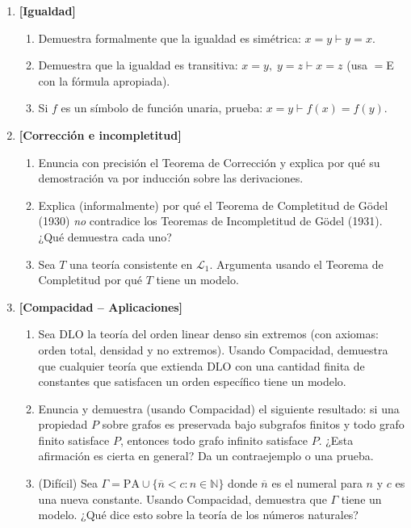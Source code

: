\begin{enumerate}[leftmargin=2em, label=\textbf{Problema \arabic*.}, itemsep=1em]
  \item \textbf{[Igualdad]}
  \begin{enumerate}[label=(\alph*)]
    \item Demuestra formalmente que la igualdad es simétrica: $x = y \vdash y = x$.
    \item Demuestra que la igualdad es transitiva: $x = y,\; y = z \vdash x = z$ (usa ${=}$E con la fórmula apropiada).
    \item Si $f$ es un símbolo de función unaria, prueba: $x = y \vdash f(x) = f(y)$.
  \end{enumerate}

  \item \textbf{[Corrección e incompletitud]}
  \begin{enumerate}[label=(\alph*)]
    \item Enuncia con precisión el Teorema de Corrección y explica por qué su demostración va por inducción sobre las derivaciones.
    \item Explica (informalmente) por qué el Teorema de Completitud de Gödel (1930) \emph{no} contradice los Teoremas de Incompletitud de Gödel (1931). ¿Qué demuestra cada uno?
    \item Sea $T$ una teoría consistente en $\mathcal{L}_1$. Argumenta usando el Teorema de Completitud por qué $T$ tiene un modelo.
  \end{enumerate}

  \item \textbf{[Compacidad -- Aplicaciones]}
  \begin{enumerate}[label=(\alph*)]
    \item Sea $\mathrm{DLO}$ la teoría del orden linear denso sin extremos (con axiomas: orden total, densidad y no extremos). Usando Compacidad, demuestra que cualquier teoría que extienda $\mathrm{DLO}$ con una cantidad finita de constantes que satisfacen un orden específico tiene un modelo.
    \item Enuncia y demuestra (usando Compacidad) el siguiente resultado: si una propiedad $P$ sobre grafos es preservada bajo subgrafos finitos y todo grafo finito satisface $P$, entonces todo grafo infinito satisface $P$. ¿Esta afirmación es cierta en general? Da un contraejemplo o una prueba.
    \item (Difícil) Sea $\Gamma = \mathrm{PA} \cup \{\overline{n} < c : n \in \mathbb{N}\}$ donde $\overline{n}$ es el numeral para $n$ y $c$ es una nueva constante. Usando Compacidad, demuestra que $\Gamma$ tiene un modelo. ¿Qué dice esto sobre la teoría de los números naturales?
  \end{enumerate}


\end{enumerate}
